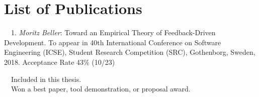 \chapter*{List of Publications}
\label{publications}


\begin{etaremune}{\small
\item[\faFileTextO~~1.] \emph{Moritz Beller}: Toward an Empirical Theory of
  Feedback-Driven Development. To appear in 40th International Conference on
  Software Engineering (ICSE), Student Research Competition (SRC),
  Gothenborg, Sweden, 2018. Acceptance Rate 43\% (10/23)
}\end{etaremune}

\vspace{0.5cm}
\noindent
\faFileTextO~~Included in this thesis.\\
\faTrophy~~Won a best paper, tool demonstration, or proposal award.
